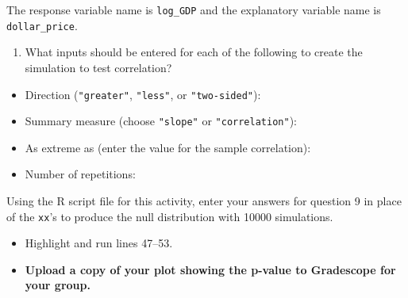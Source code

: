 \documentclass[
]{report}
\providecommand{\tightlist}{%
  \setlength{\itemsep}{0pt}\setlength{\parskip}{0pt}}
\begin{document}
The response variable name is \texttt{log\_GDP} and the explanatory variable name is \texttt{dollar\_price}.

\begin{enumerate}
\def\labelenumi{\arabic{enumi}.}
\setcounter{enumi}{8}
\tightlist
\item
  What inputs should be entered for each of the following to create the simulation to test correlation?
\end{enumerate}

\vspace{.5 mm}

\begin{itemize}
\tightlist
\item
  Direction (\texttt{"greater"}, \texttt{"less"}, or \texttt{"two-sided"}):
\end{itemize}

\vspace{.2in}

\begin{itemize}
\tightlist
\item
  Summary measure (choose \texttt{"slope"} or \texttt{"correlation"}):
\end{itemize}

\vspace{.2in}

\begin{itemize}
\tightlist
\item
  As extreme as (enter the value for the sample correlation):
\end{itemize}

\vspace{0.2in}

\begin{itemize}
\tightlist
\item
  Number of repetitions:
\end{itemize}

\vspace{.2in}

Using the R script file for this activity, enter your answers for question 9 in place of the \texttt{xx}'s to produce the null distribution with 10000 simulations.

\begin{itemize}
\item
  Highlight and run lines 47--53.
\item
  \textbf{Upload a copy of your plot showing the p-value to Gradescope for your group.}
\end{itemize}
\end{document}
